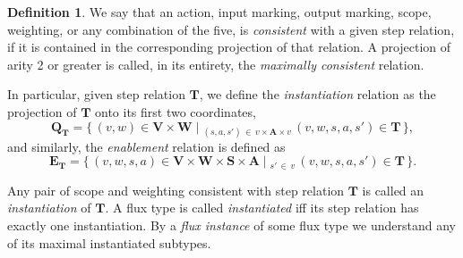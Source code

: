 \documentclass [a4paper,12pt] {article}
\theoremstyle{definition}
\newtheorem{definition}{Definition}[section]
\newcommand{\Exists}{}
\DeclareRobustCommand{\Exists}{\mathop{\mathlarger{\exists}}}
\begin{document}
\begin {definition}\label {def:consistency-and-instance}
  We say that an action, input marking, output marking, scope,
  weighting, or any combination of the five, is {\em consistent}\/
  with a given step relation, if it is contained in the corresponding
  projection of that relation.  A projection of arity 2 or greater is
  called, in its entirety, the {\em maximally consistent}\/ relation.

  In particular, given step relation $\mathbf {T}$, we define the {\em
    instantiation}\/ relation as the projection of $\mathbf {T}$ onto
  its first two coordinates,
%
\begin {equation*}
  \mathbf {Q}_{\mathbf {T}} = \{\, (v, w) \in \mathbf {V}{\times}\mathbf {W} \;|\;
  \Exists_{(s, a, s')\,\in\,v{\times}\mathbf {A}{\times}v}\,
  (v, w, s, a, s') \in \mathbf {T}\, \},
\end {equation*}
%
and similarly, the {\em enablement}\/ relation is defined as
%
\begin {equation*}
  \mathbf {E}_{\mathbf {T}} = \{\, (v, w, s, a) \in \mathbf {V}{\times}\mathbf {W}{\times}\mathbf {S}{\times}\mathbf {A}
  \;|\; \Exists_{s'\,\in\, v}\,(v, w, s, a, s') \in \mathbf {T}\, \}.
\end {equation*}

Any pair of scope and weighting consistent with step relation $\mathbf
{T}$ is called an {\em instantiation}\/ of $\mathbf {T}$.  A flux type
is called {\em instantiated}\/ iff its step relation has exactly one
instantiation.  By a {\em flux instance}\/ of some flux type we
understand any of its maximal instantiated subtypes.


\end{definition}
\end{document}
